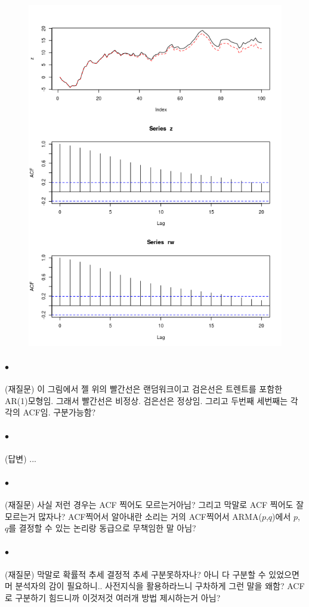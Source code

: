 \documentclass[12pt,oneside,english]{book}
\def\ck{\paragraph{\Large$\bullet$}\Large}
\begin{document}
\begin{figure}[h]
\includegraphics[width=1\textwidth]{fig1.png}
\end{figure}

\ck (재질문) 이 그림에서 젤 위의 빨간선은 랜덤워크이고 검은선은 트렌트를 포함한 AR(1)모형임. 그래서 빨간선은 비정상. 검은선은 정상임. 그리고 두번째 세번째는 각각의 ACF임. 구분가능함? 

\ck (답변) ... 


\ck (재질문) 사실 저런 경우는 ACF 찍어도 모르는거아님? 그리고 막말로 ACF 찍어도 잘 모르는거 많자나? ACF찍어서 알아내란 소리는 거의 ACF찍어서 ARMA($p$,$q$)에서 $p$, $q$를 결정할 수 있는 논리랑 동급으로 무책임한 말 아님? 

\ck (재질문) 막말로 확률적 추세 결정적 추세 구분못하자나? 아니 다 구분할 수 있었으면 머 분석자의 감이 필요하니.. 사전지식을 활용하라느니 구차하게 그런 말을 왜함? ACF로 구분하기 힘드니까 이것저것 여러개 방법 제시하는거 아님? 
\end{document}
